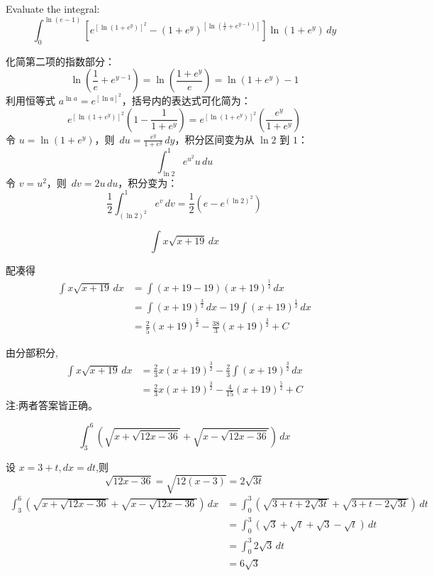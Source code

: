 \begin{questions}
    \question
Evaluate the integral:
\[
\int_0^{\ln(e-1)} \left[ e^{[\ln(1+e^y)]^2} - (1+e^y)^{\left[ \ln\left(\frac{1}{e} + e^{y-1}\right) \right]} \right] \ln(1+e^y) \,dy
\]
\begin{solution}
化简第二项的指数部分：
\[
\ln\left(\frac{1}{e} + e^{y-1}\right) = \ln\left(\frac{1 + e^y}{e}\right) = \ln(1 + e^y) - 1
\]
利用恒等式 $a^{\ln a} = e^{[\ln a]^2}$，括号内的表达式可化简为：
\[
e^{[\ln(1+e^y)]^2} \left( 1 - \frac{1}{1 + e^y} \right) = e^{[\ln(1+e^y)]^2} \left( \frac{e^y}{1 + e^y} \right)
\]
令 $u = \ln(1 + e^y)$，则 $\,du = \frac{e^y}{1 + e^y} \,dy$，积分区间变为从 $\ln 2$ 到 $1$：
\[
\int_{\ln 2}^1 e^{u^2} u \,du
\]
令 $v = u^2$，则 $\,dv = 2u \,du$，积分变为：
\[
\frac{1}{2} \int_{(\ln 2)^2}^1 e^v \,dv = \frac{1}{2} \left( e - e^{(\ln 2)^2} \right)
\]
\end{solution}
    \question 
    \[
    \int x\sqrt{x+19} \, dx
    \]
    \begin{solution}
        配凑得
        \begin{align*}
        \int x\sqrt{x+19} \, dx &= \int (x+19-19)(x+19)^{\frac{1}{2}} \, dx \\
        &= \int (x+19)^{\frac{3}{2}} \, dx - 19\int (x+19)^{\frac{1}{2}} \, dx \\
        &= \frac{2}{5}(x+19)^{\frac{5}{2}} - \frac{38}{3}(x+19)^{\frac{3}{2}} + C
        \end{align*}
    \end{solution}
    \begin{solution}
        由分部积分,
        \begin{align*}
        \int x\sqrt{x+19} \, dx &= \frac{2}{3}x(x+19)^{\frac{3}{2}} - \frac{2}{3}\int (x+19)^{\frac{3}{2}} \, dx \\
        &= \frac{2}{3}x(x+19)^{\frac{3}{2}} - \frac{4}{15}(x+19)^{\frac{5}{2}} + C
        \end{align*}
        注:两者答案皆正确。
    \end{solution}

    \question
    \[
    \int_{3}^{6} (\sqrt{x+\sqrt{12x-36}} + \sqrt{x-\sqrt{12x-36}}) \, dx
    \]
    \begin{solution}
        设 $x = 3+t, dx = dt$,则
        \[
        \sqrt{12x-36} = \sqrt{12(x-3)} = 2\sqrt{3t}
        \]
        \begin{align*}
        \int_{3}^{6} (\sqrt{x+\sqrt{12x-36}} + \sqrt{x-\sqrt{12x-36}}) \, dx &= \int_{0}^{3} \left(\sqrt{3+t+2\sqrt{3t}} + \sqrt{3+t-2\sqrt{3t}}\right) \, dt \\
        &= \int_{0}^{3} \left(\sqrt{3}+\sqrt{t}+\sqrt{3}-\sqrt{t}\right) \, dt \\
        &= \int_{0}^{3} 2\sqrt{3} \, dt \\
        &= 6\sqrt{3}
        \end{align*}
    \end{solution}


\end{questions}
